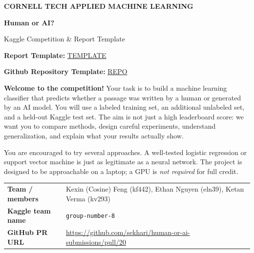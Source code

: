 \documentclass[11pt,letterpaper]{article}
\begin{document}
\thispagestyle{empty}
\vspace*{0.2in}
{\color{teal}\bfseries CORNELL TECH \textbar{} APPLIED MACHINE LEARNING}\par
\vspace{0.15in}
{\Huge\bfseries\color{navy} Human or AI?}\par
\vspace{0.07in}
{\LARGE\color{navy} Kaggle Competition \&  Report Template}\par
\vspace{0.17in}

\textbf{Report Template: }\href{https://www.overleaf.com/project/6ae1fc85355dcf680137d898/share#f2777b20d3adeeecfac9096f78008e2f8daa0ff4be43de3b}{TEMPLATE}

\textbf{Github Repository Template: }\href{https://github.com/sekhari/human-or-ai-submissions}{REPO}

\textbf{Welcome to the competition!} Your task is to build a machine learning classifier that predicts whether a passage was written by a human or generated by an AI model. You will use a labeled training set, an additional unlabeled set, and a held-out Kaggle test set. The aim is not just a high leaderboard score: we want you to compare methods, design careful experiments, understand generalization, and explain what your results actually show.

You are encouraged to try several approaches. A well-tested logistic regression or support vector machine is just as legitimate as a neural network. The project is designed to be approachable on a laptop; a GPU is \emph{not required} for full credit.

\vspace{0.06in}
\begin{tabularx}{\linewidth}{@{}>{\bfseries}p{1.58in}Y@{}}
Team / members & Kexin (Cosine) Feng (kf442), Ethan Nguyen (eln39), Ketan Verma (kv293) \\
Kaggle team name & \texttt{group-number-8} \\
GitHub PR URL & \url{https://github.com/sekhari/human-or-ai-submissions/pull/20} \\
\end{tabularx}
\vspace{0.06in}
\end{document}
